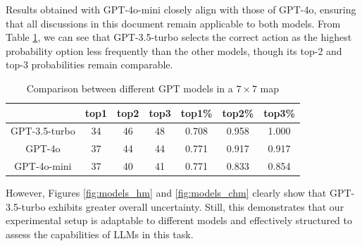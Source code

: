 Results obtained with GPT-4o-mini closely align with those of GPT-4o, ensuring
that all discussions in this document remain applicable to both models. From Table
\ref{tab:model_comparison}, we can see that GPT-3.5-turbo selects the correct
action as the highest probability option less frequently than the other models, though
its top-2 and top-3 probabilities remain comparable.

\vspace{5mm}
\begin{table}[h]
  \centering
  \begin{tabular}{c|ccc|ccc}
    \hline
                  & top1 & top2 & top3 & top1\% & top2\% & top3\% \\
    \hline
    GPT-3.5-turbo & 34   & 46   & 48   & 0.708  & 0.958  & 1.000  \\
    GPT-4o        & 37   & 44   & 44   & 0.771  & 0.917  & 0.917  \\
    GPT-4o-mini   & 37   & 40   & 41   & 0.771  & 0.833  & 0.854  \\
    \hline
  \end{tabular}
  \caption{Comparison between different GPT models in a $7 \times 7$ map}
  \label{tab:model_comparison}
\end{table}
\vspace{5mm}

However, Figures \ref{fig:models_hm} and \ref{fig:models_chm} clearly show that GPT-3.5-turbo
exhibits greater overall uncertainty. Still, this demonstrates that our experimental
setup is adaptable to different models and effectively structured to assess the capabilities
of LLMs in this task.

